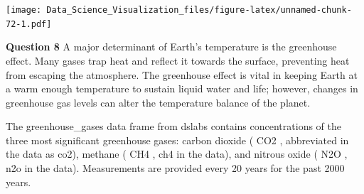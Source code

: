 \documentclass[
]{article}
\newenvironment{Shaded}{\begin{snugshade}}{\end{snugshade}}
\newcommand{\DataTypeTok}[1]{\textcolor[rgb]{0.13,0.29,0.53}{#1}}
\newcommand{\DecValTok}[1]{\textcolor[rgb]{0.00,0.00,0.81}{#1}}
\newcommand{\FloatTok}[1]{\textcolor[rgb]{0.00,0.00,0.81}{#1}}
\newcommand{\KeywordTok}[1]{\textcolor[rgb]{0.13,0.29,0.53}{\textbf{#1}}}
\newcommand{\NormalTok}[1]{#1}
\newcommand{\OperatorTok}[1]{\textcolor[rgb]{0.81,0.36,0.00}{\textbf{#1}}}
\newcommand{\StringTok}[1]{\textcolor[rgb]{0.31,0.60,0.02}{#1}}
\begin{document}
\begin{Shaded}
\end{Shaded}

\texttt{[image: Data\_Science\_Visualization\_files/figure-latex/unnamed-chunk-72-1.pdf]}

\textbf{Question 8} A major determinant of Earth's temperature is the
greenhouse effect. Many gases trap heat and reflect it towards the
surface, preventing heat from escaping the atmosphere. The greenhouse
effect is vital in keeping Earth at a warm enough temperature to sustain
liquid water and life; however, changes in greenhouse gas levels can
alter the temperature balance of the planet.

The greenhouse\_gases data frame from dslabs contains concentrations of
the three most significant greenhouse gases: carbon dioxide ( CO2 ,
abbreviated in the data as co2), methane ( CH4 , ch4 in the data), and
nitrous oxide ( N2O , n2o in the data). Measurements are provided every
20 years for the past 2000 years.
\end{document}
